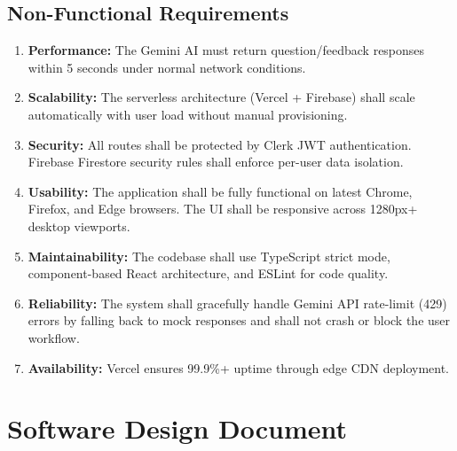 \subsection{Non-Functional Requirements}
\begin{enumerate}
	\item \textbf{Performance:} The Gemini AI must return question/feedback responses within 5 seconds under normal network conditions.
	\item \textbf{Scalability:} The serverless architecture (Vercel + Firebase) shall scale automatically with user load without manual provisioning.
	\item \textbf{Security:} All routes shall be protected by Clerk JWT authentication. Firebase Firestore security rules shall enforce per-user data isolation.
	\item \textbf{Usability:} The application shall be fully functional on latest Chrome, Firefox, and Edge browsers. The UI shall be responsive across 1280px+ desktop viewports.
	\item \textbf{Maintainability:} The codebase shall use TypeScript strict mode, component-based React architecture, and ESLint for code quality.
	\item \textbf{Reliability:} The system shall gracefully handle Gemini API rate-limit (429) errors by falling back to mock responses and shall not crash or block the user workflow.
	\item \textbf{Availability:} Vercel ensures 99.9\%+ uptime through edge CDN deployment.
\end{enumerate}

\section{Software Design Document}

